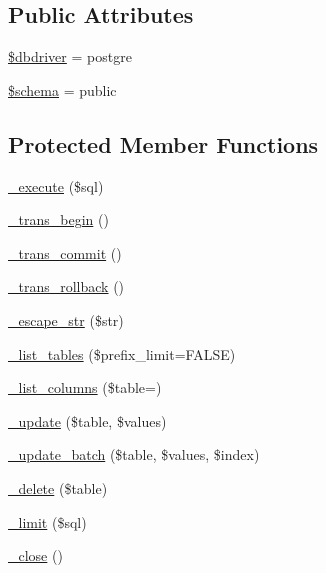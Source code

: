 \subsection*{Public Attributes}
\begin{DoxyCompactItemize}
\item 
\mbox{\hyperlink{class_c_i___d_b__postgre__driver_a0cde2a16322a023d040aa7f725877597}{\$dbdriver}} = \textquotesingle{}postgre\textquotesingle{}
\item 
\mbox{\hyperlink{class_c_i___d_b__postgre__driver_a83022b1d70799d2bde3d64dca9cb40ee}{\$schema}} = \textquotesingle{}public\textquotesingle{}
\end{DoxyCompactItemize}
\subsection*{Protected Member Functions}
\begin{DoxyCompactItemize}
\item 
\mbox{\hyperlink{class_c_i___d_b__postgre__driver_a114ab675d89bf8324a41785fb475e86d}{\+\_\+execute}} (\$sql)
\item 
\mbox{\hyperlink{class_c_i___d_b__postgre__driver_ac81ac882c1d54347d810199a15856aac}{\+\_\+trans\+\_\+begin}} ()
\item 
\mbox{\hyperlink{class_c_i___d_b__postgre__driver_a6fe7f373e0b11cfae23a5f41c0b35dda}{\+\_\+trans\+\_\+commit}} ()
\item 
\mbox{\hyperlink{class_c_i___d_b__postgre__driver_ad49a116b0776c26b53114c9093fd102a}{\+\_\+trans\+\_\+rollback}} ()
\item 
\mbox{\hyperlink{class_c_i___d_b__postgre__driver_af8ef0237bfcdb19215b63fff769e7a55}{\+\_\+escape\+\_\+str}} (\$str)
\item 
\mbox{\hyperlink{class_c_i___d_b__postgre__driver_a435c0f3ce54fe7daa178baa8532ebd54}{\+\_\+list\+\_\+tables}} (\$prefix\+\_\+limit=F\+A\+L\+SE)
\item 
\mbox{\hyperlink{class_c_i___d_b__postgre__driver_a7ccb7f9c301fe7f0a9db701254142b63}{\+\_\+list\+\_\+columns}} (\$table=\textquotesingle{}\textquotesingle{})
\item 
\mbox{\hyperlink{class_c_i___d_b__postgre__driver_a2540b03a93fa73ae74c10d0e16fc073e}{\+\_\+update}} (\$table, \$values)
\item 
\mbox{\hyperlink{class_c_i___d_b__postgre__driver_a336b9ebb119e47b6a84bb7fc9d4dae93}{\+\_\+update\+\_\+batch}} (\$table, \$values, \$index)
\item 
\mbox{\hyperlink{class_c_i___d_b__postgre__driver_a133ea8446ded52589bd22cc9163d0896}{\+\_\+delete}} (\$table)
\item 
\mbox{\hyperlink{class_c_i___d_b__postgre__driver_a3a02ea06541b8ecc25a33a61651562c8}{\+\_\+limit}} (\$sql)
\item 
\mbox{\hyperlink{class_c_i___d_b__postgre__driver_a4d9082658000e5ede8312067c6dda9db}{\+\_\+close}} ()
\end{DoxyCompactItemize}
